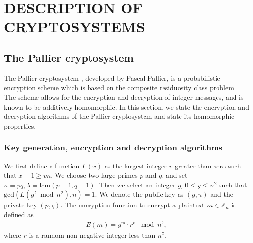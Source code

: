 

\chapter{DESCRIPTION OF CRYPTOSYSTEMS}
\section{The Pallier cryptosystem}
The Pallier cryptosystem \cite{stern_public-key_1999}, developed by Pascal Pallier, is a probabilistic encryption scheme which is based on the composite residuosity class problem. The scheme allows for the encryption and decryption of integer messages, and is known to be additively homomorphic. In this section, we state the encryption and decryption algorithms of the Pallier cryptosystem and state its homomorphic properties.
\subsection{Key generation, encryption and decryption algorithms}
We first define a function $L(x)$ as the largest integer $v$ greater than zero such that $x-1 \geq vn$.
We choose two large primes $p$ and $q$, and set $n = pq, \lambda = \mathrm{lcm}(p-1,q-1)$.
Then we select an integer $g$, $0\leq g \leq n^2$ such that $\mathrm{gcd}(L(g^\lambda \bmod n^2), n) = 1$.
We denote the public key as $(g,n)$ and the private key $(p,q)$.
The encryption function to encrypt a plaintext $m \in \mathbb{Z}_n$ is defined as
\begin{align*}
  E(m) = g^m \cdot r^n \mod{n^2},
\end{align*}
where $r$ is a random non-negative integer less than $n^2$.

